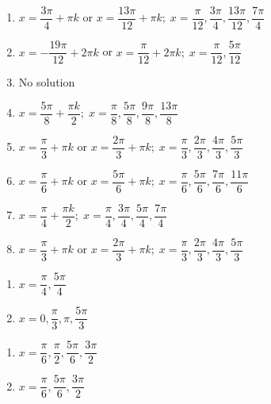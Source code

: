 \begin{enumerate}
\item $x = \dfrac{3\pi}{4} + \pi k$ or $x = \dfrac{13\pi}{12} + \pi k; \; x = \dfrac{\pi}{12}, \dfrac{3\pi}{4}, \dfrac{13\pi}{12}, \dfrac{7\pi}{4}$

\item $x = -\dfrac{19\pi}{12} + 2\pi k$ or $x = \dfrac{\pi}{12} + 2\pi k; \; x = \dfrac{\pi}{12}, \dfrac{5\pi}{12}$

\item No solution

\item $x = \dfrac{5\pi}{8} + \dfrac{\pi k}{2}; \; x = \dfrac{\pi}{8}, \dfrac{5\pi}{8}, \dfrac{9\pi}{8}, \dfrac{13\pi}{8}$

\item $x = \dfrac{\pi}{3} + \pi k$ or $x = \dfrac{2\pi}{3} + \pi k; \; x = \dfrac{\pi}{3}, \dfrac{2\pi}{3}, \dfrac{4\pi}{3}, \dfrac{5\pi}{3}$

\item $x = \dfrac{\pi}{6} + \pi k$ or $x = \dfrac{5\pi}{6} + \pi k; \; x = \dfrac{\pi}{6}, \dfrac{5\pi}{6}, \dfrac{7\pi}{6}, \dfrac{11\pi}{6}$

\item $x = \dfrac{\pi}{4} + \dfrac{\pi k}{2}; \; x = \dfrac{\pi}{4}, \dfrac{3\pi}{4}, \dfrac{5\pi}{4}, \dfrac{7\pi}{4}$

\item $x = \dfrac{\pi}{3} + \pi k$ or $x = \dfrac{2\pi}{3} + \pi k; \; x = \dfrac{\pi}{3}, \dfrac{2\pi}{3}, \dfrac{4\pi}{3}, \dfrac{5\pi}{3}$

\setcounter{HW}{\value{enumi}}

\end{enumerate}

\begin{multicols}{2}

\begin{enumerate}

\setcounter{enumi}{\value{HW}}

\item $x = \dfrac{\pi}{4}, \dfrac{5\pi}{4}$
\item $x = 0, \dfrac{\pi}{3}, \pi, \dfrac{5\pi}{3}$

\setcounter{HW}{\value{enumi}}

\end{enumerate}

\end{multicols}

\begin{multicols}{2}

\begin{enumerate}

\setcounter{enumi}{\value{HW}}

\item $x = \dfrac{\pi}{6}, \dfrac{\pi}{2}, \dfrac{5\pi}{6}, \dfrac{3\pi}{2}$
\item $x = \dfrac{\pi}{6}, \dfrac{5\pi}{6}, \dfrac{3\pi}{2}$

\setcounter{HW}{\value{enumi}}

\end{enumerate}

\end{multicols}

